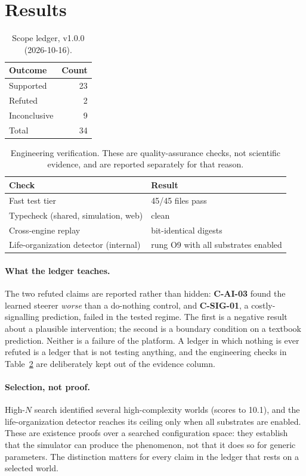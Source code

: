 \documentclass[11pt,a4paper]{article}
\begin{document}
\section{Results}\label{sec:results}
\begin{table}[t]\centering
\caption{Scope ledger, v1.0.0 (2026-10-16).}\label{tab:scope}
\begin{tabular}{l r}
\toprule
Outcome & Count\\
\midrule
Supported & 23\\
Refuted & 2\\
Inconclusive & 9\\
\midrule
Total & 34\\
\bottomrule
\end{tabular}
\end{table}

\begin{table}[t]\centering
\caption{Engineering verification. These are quality-assurance checks, not
scientific evidence, and are reported separately for that reason.}\label{tab:verify}
\begin{tabular}{l l}
\toprule
Check & Result\\
\midrule
Fast test tier & 45/45 files pass\\
Typecheck (shared, simulation, web) & clean\\
Cross-engine replay & bit-identical digests\\
Life-organization detector (internal) & rung O9 with all substrates enabled\\
\bottomrule
\end{tabular}
\end{table}

\paragraph{What the ledger teaches.} The two refuted claims are reported rather
than hidden: \textbf{C-AI-03} found the learned steerer \emph{worse} than a
do-nothing control, and \textbf{C-SIG-01}, a costly-signalling prediction, failed
in the tested regime. The first is a negative result about a plausible
intervention; the second is a boundary condition on a textbook prediction.
Neither is a failure of the platform. A ledger in which nothing is ever refuted
is a ledger that is not testing anything, and the engineering checks in
Table~\ref{tab:verify} are deliberately kept out of the evidence column.

\paragraph{Selection, not proof.} High-$N$ search identified several
high-complexity worlds (scores to 10.1), and the life-organization detector
reaches its ceiling only when all substrates are enabled. These are existence
proofs over a searched configuration space: they establish that the simulator
can produce the phenomenon, not that it does so for generic parameters. The
distinction matters for every claim in the ledger that rests on a selected
world.
\end{document}
